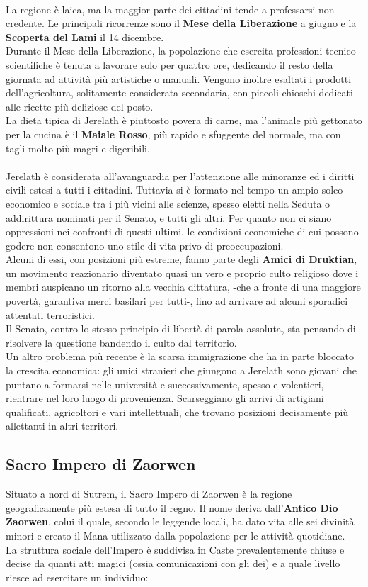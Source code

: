 \documentclass[a4paper]{scrreprt}
\begin{document}
\\
La regione è laica, ma la maggior parte dei cittadini tende a professarsi non credente. Le principali ricorrenze sono il \textbf{Mese della Liberazione} a giugno e la \textbf{Scoperta del Lami} il 14 dicembre.\\
Durante il Mese della Liberazione, la popolazione che esercita professioni tecnico-scientifiche è tenuta a lavorare solo per quattro ore, dedicando il resto della giornata ad attività più artistiche o manuali. Vengono inoltre esaltati i prodotti dell'agricoltura, solitamente considerata secondaria, con piccoli chioschi dedicati alle ricette più deliziose del posto.\\
La dieta tipica di Jerelath è piuttosto povera di carne, ma l'animale più gettonato per la cucina è il \textbf{Maiale Rosso}, più rapido e sfuggente del normale, ma con tagli molto più magri e digeribili.\\
\\
Jerelath è considerata all'avanguardia per l'attenzione alle minoranze ed i diritti civili estesi a tutti i cittadini. Tuttavia si è formato nel tempo un ampio solco economico e sociale tra i più vicini alle scienze, spesso eletti nella Seduta o addirittura nominati per il Senato, e tutti gli altri. Per quanto non ci siano oppressioni nei confronti di questi ultimi, le condizioni economiche di cui possono godere non consentono uno stile di vita privo di preoccupazioni.\\
Alcuni di essi, con posizioni più estreme, fanno parte degli \textbf{Amici di Druktian}, un movimento reazionario diventato quasi un vero e proprio culto religioso dove i membri auspicano un ritorno alla vecchia dittatura, -che a fronte di una maggiore povertà, garantiva merci basilari per tutti-, fino ad arrivare ad alcuni sporadici attentati terroristici.\\
Il Senato, contro lo stesso principio di libertà di parola assoluta, sta pensando di risolvere la questione bandendo il culto dal territorio.\\
Un altro problema più recente è la scarsa immigrazione che ha in parte bloccato la crescita economica: gli unici stranieri che giungono a Jerelath sono giovani che puntano a formarsi nelle università e successivamente, spesso e volentieri, rientrare nel loro luogo di provenienza. Scarseggiano gli arrivi di artigiani qualificati, agricoltori e vari intellettuali, che trovano posizioni decisamente più allettanti in altri territori.  

\subsection{Sacro Impero di Zaorwen}
Situato a nord di Sutrem, il Sacro Impero di Zaorwen è la regione geograficamente più estesa di tutto il regno. Il nome deriva dall'\textbf{Antico Dio Zaorwen}, colui il quale, secondo le leggende locali, ha dato vita alle sei divinità minori e creato il Mana utilizzato dalla popolazione per le attività quotidiane.\\
La struttura sociale dell'Impero è suddivisa in Caste prevalentemente chiuse e decise da quanti atti magici (ossia comunicazioni con gli dei) e a quale livello riesce ad esercitare un individuo:
\end{document}
